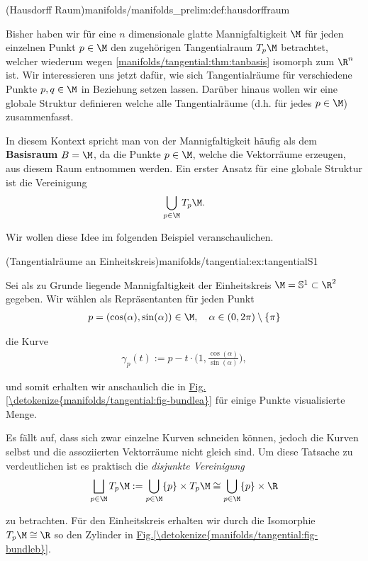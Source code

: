 \documentclass[letterpaper,10pt,english]{jupyterBook}
\begin{document}
\begin{definition}{(Hausdorff Raum)}{manifolds/manifolds_prelim:def:hausdorffraum}
\par
Bisher haben wir für eine \(n\) dimensionale glatte Mannigfaltigkeit \(\M\) für jeden einzelnen Punkt \(p\in\M\) den zugehörigen Tangentialraum \(T_p\M\) betrachtet, welcher wiederum wegen \cref{manifolds/tangential:thm:tanbasis} isomorph zum \(\R^n\) ist.
Wir interessieren uns jetzt dafür, wie sich Tangentialräume für verschiedene Punkte \(p,q\in \M\) in Beziehung setzen lassen.
Darüber hinaus wollen wir eine globale Struktur definieren welche alle Tangentialräume (d.h. für jedes \(p\in\M\)) zusammenfasst.

\par
In diesem Kontext spricht man von der Mannigfaltigkeit häufig als dem \textbf{Basisraum} \(B=\M\), da die Punkte \(p \in \M\), welche die Vektorräume erzeugen, aus diesem Raum entnommen werden.
Ein erster Ansatz für eine globale Struktur ist die Vereinigung
\begin{align*}
\bigcup_{p\in\M} T_p\M.
\end{align*}
\par
Wir wollen diese Idee im folgenden Beispiel veranschaulichen.
\begin{example}{(Tangentialräume an Einheitskreis)}{manifolds/tangential:ex:tangentialS1}



\par
Sei als zu Grunde liegende Mannigfaltigkeit der Einheitskreis \(\M = \mathbb{S}^1\subset\R^2\) gegeben.
Wir wählen als Repräsentanten für jeden Punkt
\begin{align*}
p=(\cos(\alpha), \sin(\alpha))\in\M, \quad \alpha\in (0,2\pi) \setminus \{\pi\}
\end{align*}
\par
die Kurve
\begin{align*}
\gamma_p(t) := p - t \cdot\big(1, \frac{\cos(\alpha)}{\sin(\alpha)}\big),
\end{align*}
\par
und somit erhalten wir anschaulich die in \hyperref[\detokenize{manifolds/tangential:fig-bundlea}]{Fig.\@ \ref{\detokenize{manifolds/tangential:fig-bundlea}}} für einige Punkte visualisierte Menge.

\par
Es fällt auf, dass sich zwar einzelne Kurven schneiden können, jedoch die Kurven selbst und die assoziierten Vektorräume nicht gleich sind.
Um diese Tatsache zu verdeutlichen ist es praktisch die \emph{disjunkte Vereinigung}
\begin{align*}
\bigsqcup_{p\in\M} T_p\M := \bigcup_{p\in\M} \{p\} \times T_p\M \cong \bigcup_{p\in\M} \{p\} \times \R
\end{align*}
\par
zu betrachten.
Für den Einheitskreis erhalten wir durch die Isomorphie \(T_p\M \cong \R\) so den Zylinder in \hyperref[\detokenize{manifolds/tangential:fig-bundleb}]{Fig.\@ \ref{\detokenize{manifolds/tangential:fig-bundleb}}}.
\end{example}


\end{definition}
\end{document}
